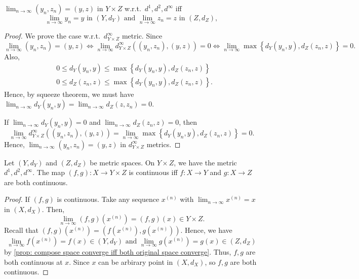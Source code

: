 \begin{proposition} \label{prop: compose space converge iff both original space converge}
    \(\lim_{n \to \infty} (y_n, z_n) = (y, z) \) in \(Y \times Z\) w.r.t.\ \(d^1, d^2, d^{\infty} \) iff 
    \[
        \lim_{n \to \infty} y_n = y \text{ in } (Y, d_Y) \text{ and } \lim_{n \to \infty} z_n = z \text{ in } (Z, d_Z),  
    \]   
\end{proposition}
\begin{proof}
    We prove the case w.r.t.\ \(d_{Y \times Z}^{\infty} \) metric. Since 
    \[
        \lim_{n \to \infty} (y_n, z_n) = (y, z) \iff  \lim_{n \to \infty} d_{Y \times Z}^{\infty} \left( (y_n, z_n), (y, z) \right) = 0 \iff \lim_{n \to \infty} \max \left\{ d_Y(y_n, y), d_Z(z_n, z) \right\} = 0.     
    \] Also, 
    \begin{align*}
        &0 \le d_Y(y_n, y) \le \max \left\{ d_Y(y_n, y), d_Z(z_n, z) \right\} \\
        &0 \le d_Z(z_n, z) \le \max \left\{ d_Y(y_n, y), d_Z(z_n, z) \right\}. 
    \end{align*}
    Hence, by squeeze theorem, we must have \(\lim_{n \to \infty} d_Y(y_n, y) = \lim_{n \to \infty} d_Z(z, z_n)=0  \). 
    
    If \(\lim_{n \to \infty} d_Y (y_n, y) = 0 \) and \(\lim_{n \to \infty} d_Z(z_n, z) = 0 \), then 
    \[
        \lim_{n \to \infty} d_{Y \times Z}^{\infty} \left( (y_n, z_n), (y, z) \right) = \lim_{n \to \infty} \max \left\{ d_Y(y_n, y), d_Z(z_n, z) \right\} = 0.  
    \]  
    Hence, \(\lim_{n \to \infty} (y_n, z_n) = (y, z) \) in \(d_{Y \times Z}^{\infty} \) metrics.  
\end{proof}

\begin{theorem} \label{thm: f compose g conti if f and g both conti}
    Let \((Y, d_Y)\) and \((Z, d_Z)\) be metric spaces. On \(Y \times Z\), we have the metric \(d^1, d^2, d^{\infty} \). The map \((f, g): X \to Y \times Z\) is continuous iff \(f: X \to Y\) and \(g: X \to Z\) are both continuous.       
\end{theorem}
\begin{proof}
    If \((f, g)\) is continuous. Take any sequence \(x^{(n)}\) with \(\lim_{n \to \infty} x^{(n)} = x \) in \((X, d_X)\). Then, 
    \[
        \lim_{n \to \infty} \left( f ,g \right)\left( x^{(n)} \right) = \left( f ,g \right)(x) \in Y \times Z.    
    \] Recall that \(\left( f, g \right) \left( x^{(n)} \right) = \left( f \left( x^{(n)} \right), g \left( x^{(n)} \right)   \right)   \). Hence, we have 
    \[
        \lim_{n \to \infty} f \left( x^{(n)} \right) = f(x) \in \left( Y, d_Y \right)  \text{ and } \lim_{n \to \infty} g \left( x^{(n)} \right) = g(x) \in (Z, d_Z)
    \] by \autoref{prop: compose space converge iff both original space converge}. Thus, \(f, g\) are both continuous at \(x\). Since \(x\) can be arbirary point in \((X, d_X)\), so \(f, g\) are both continuous.    
\end{proof}

